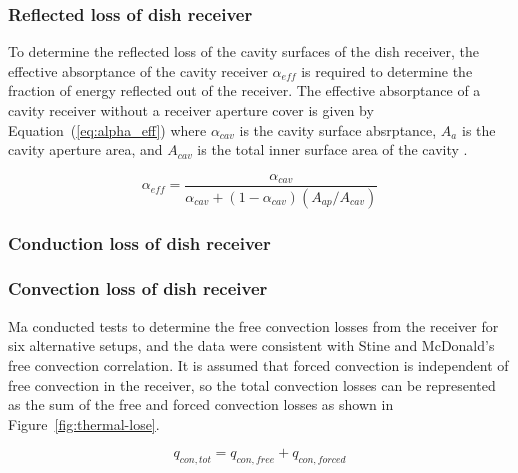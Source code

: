 \documentclass{article}
\begin{document}
\subsubsection{Reflected loss of dish receiver}
To determine the reflected loss of the cavity surfaces of the dish receiver, the effective absorptance of the cavity receiver $\alpha_{eff}$ is required to determine the fraction of energy reflected out of the receiver. The effective absorptance of a cavity receiver without a receiver aperture cover is given by Equation~(\ref{eq:alpha_eff}) where $\alpha_{cav}$ is the cavity surface absrptance, $A_a$ is the cavity aperture area, and $A_{cav}$ is the total inner surface area of the cavity \cite{Duffie2006}.

\begin{equation}
	\alpha_{eff}=\dfrac{\alpha_{cav}}{\alpha_{cav}+\left(1-\alpha_{cav}\right)\left(A_{ap}/A_{cav}\right)}
	\label{eq:alpha_eff}
\end{equation}
\subsubsection{Conduction loss of dish receiver}

\subsubsection{Convection loss of dish receiver}
Ma conducted tests to determine the free convection losses from the receiver for six alternative setups, and the data were consistent with Stine and McDonald's free convection correlation\cite{Ma1993}. It is assumed that forced convection is independent of free convection in the receiver, so the total convection losses can be represented as the sum of the free and forced convection losses as shown in Figure~\ref{fig:thermal-lose}.

\begin{equation}
	q_{con,tot} = q_{con,free} + q_{con,forced}
\end{equation}
\end{document}
